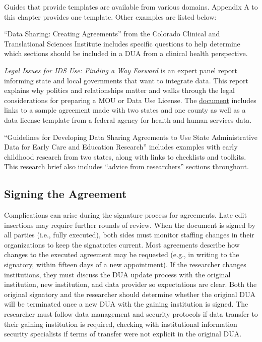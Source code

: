Guides that provide templates are available from various domains. Appendix A to this chapter provides one template. Other examples are listed below:

``Data Sharing: Creating Agreements'' \citep{jarquin2012} from the Colorado Clinical and Translational Sciences Institute includes specific questions to help determine which sections should be included in a DUA from a clinical health perspective.

\emph{Legal Issues for IDS Use: Finding a Way Forward} \citep{petrila2017} is an expert panel report informing state and local governments that want to integrate data. This report explains why politics and relationships matter and walks through the legal considerations for preparing a MOU or Data Use License. The \href{https://1slo241vnt3j2dn45s1y90db-wpengine.netdna-ssl.com/wp-content/uploads/2016/07/Legal-Issues.pdf}{document} includes links to a sample agreement made with two states and one county as well as a data license template from a federal agency for health and human services data.

``Guidelines for Developing Data Sharing Agreements to Use State Administrative Data for Early Care and Education Research'' \citep{shaw2018} includes examples with early childhood research from two states, along with links to checklists and toolkits. This research brief also includes ``advice from researchers'' sections throughout.

\hypertarget{signing-the-agreement}{%
\subsection{Signing the Agreement}\label{signing-the-agreement}}

Complications can arise during the signature process for agreements. Late edit insertions may require further rounds of review. When the document is signed by all parties (i.e., fully executed), both sides must monitor staffing changes in their organizations to keep the signatories current. Most agreements describe how changes to the executed agreement may be requested (e.g., in writing to the signatory, within fifteen days of a new appointment). If the researcher changes institutions, they must discuss the DUA update process with the original institution, new institution, and data provider so expectations are clear. Both the original signatory and the researcher should determine whether the original DUA will be terminated once a new DUA with the gaining institution is signed. The researcher must follow data management and security protocols if data transfer to their gaining institution is required, checking with institutional information security specialists if terms of transfer were not explicit in the original DUA.

